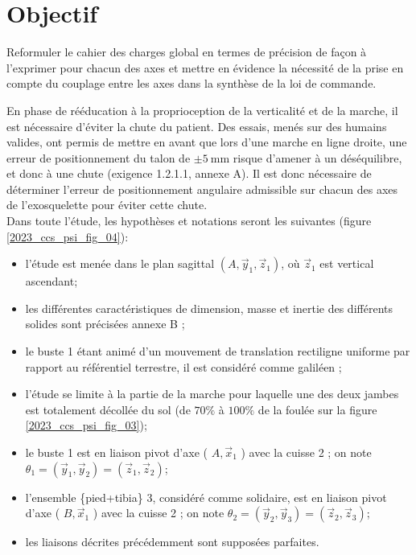 \ifprof
\else
\section*{Objectif}
Reformuler le cahier des charges global en termes de précision de façon à l'exprimer pour chacun des axes et mettre en évidence la nécessité de la prise en compte du couplage entre les axes dans la synthèse de la loi de commande.

En phase de rééducation à la proprioception de la verticalité et de la marche, il est nécessaire d'éviter la chute du patient. Des essais, menés sur des humains valides, ont permis de mettre en avant que lors d'une marche en ligne droite, une erreur de positionnement du talon de $\pm 5 \mathrm{~mm}$ risque d'amener à un déséquilibre, et donc à une chute (exigence 1.2.1.1, annexe A). Il est donc nécessaire de déterminer l'erreur de positionnement angulaire admissible sur chacun des axes de l'exosquelette pour éviter cette chute.\\
Dans toute l'étude, les hypothèses et notations seront les suivantes (figure \ref{2023_ccs_psi_fig_04}):

\begin{itemize}
  \item l'étude est menée dans le plan sagittal $\left(A, \vec{y}_{1}, \vec{z}_{1}\right)$, où $\vec{z}_{1}$ est vertical ascendant;
  \item les différentes caractéristiques de dimension, masse et inertie des différents solides sont précisées annexe B ;
  \item le buste 1 étant animé d'un mouvement de translation rectiligne uniforme par rapport au référentiel terrestre, il est considéré comme galiléen ;
  \item l'étude se limite à la partie de la marche pour laquelle une des deux jambes est totalement décollée du sol (de $70 \%$ à $100 \%$ de la foulée sur la figure \ref{2023_ccs_psi_fig_03});
  \item le buste 1 est en liaison pivot d'axe ( $A, \vec{x}_{1}$ ) avec la cuisse 2 ; on note $\theta_{1}=\left(\vec{y}_{1}, \vec{y}_{2}\right)=\left(\vec{z}_{1}, \vec{z}_{2}\right)$;
  \item l'ensemble \{pied+tibia\} 3, considéré comme solidaire, est en liaison pivot d'axe ( $B, \vec{x}_{1}$ ) avec la cuisse 2 ; on note $\theta_{2}=\left(\vec{y}_{2}, \vec{y}_{3}\right)=\left(\vec{z}_{2}, \vec{z}_{3}\right)$;
  \item les liaisons décrites précédemment sont supposées parfaites.\\
\end{itemize}


